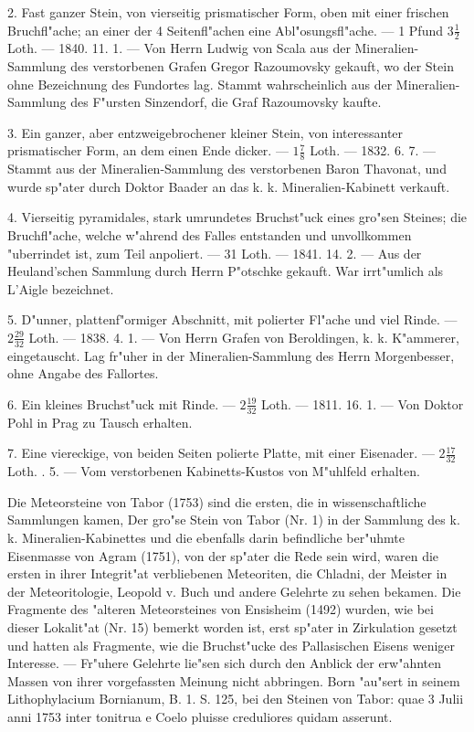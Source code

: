\documentclass[a4paper, 11pt, oneside, polutonikogreek, german]{article}
\begin{document}
2. Fast ganzer Stein, von vierseitig prismatischer Form, oben mit einer frischen Bruchfl"ache; an einer der 4 Seitenfl"achen eine Abl"osungsfl"ache. --- 1 Pfund $\mathfrak{3\frac{1}{2}}$ Loth. --- 1840. 11. 1. --- Von Herrn Ludwig von Scala aus der Mineralien-Sammlung des verstorbenen Grafen Gregor Razoumovsky gekauft, wo der Stein ohne Bezeichnung des Fundortes lag. Stammt wahrscheinlich aus der Mineralien-Sammlung des F"ursten Sinzendorf, die Graf Razoumovsky kaufte.

3. Ein ganzer, aber entzweigebrochener kleiner Stein, von interessanter prismatischer Form, an dem einen Ende dicker. --- $\mathfrak{1\frac{7}{8}}$ Loth. --- 1832. 6. 7. --- Stammt aus der Mineralien-Sammlung des verstorbenen Baron Thavonat, und wurde sp"ater durch Doktor Baader an das k. k. Mineralien-Kabinett verkauft.

4. Vierseitig pyramidales, stark umrundetes Bruchst"uck eines gro"sen Steines; die Bruchfl"ache, welche w"ahrend des Falles entstanden und unvollkommen "uberrindet ist, zum Teil anpoliert. --- 31 Loth. --- 1841. 14. 2. --- Aus der Heuland'schen Sammlung durch Herrn P"otschke gekauft. War irrt"umlich als L'Aigle bezeichnet.

5. D"unner, plattenf"ormiger Abschnitt, mit polierter Fl"ache und viel Rinde. --- $\mathfrak{2\frac{29}{32}}$ Loth. --- 1838. 4. 1. --- Von Herrn Grafen von Beroldingen, k. k. K"ammerer, eingetauscht. Lag fr"uher in der Mineralien-Sammlung des Herrn Morgenbesser, ohne Angabe des Fallortes.

6. Ein kleines Bruchst"uck mit Rinde. --- $\mathfrak{2\frac{19}{32}}$ Loth. --- 1811. 16. 1. --- Von Doktor Pohl in Prag zu Tausch erhalten.

7. Eine viereckige, von beiden Seiten polierte Platte, mit einer Eisenader. --- $\mathfrak{2\frac{17}{32}}$ Loth. . 5. --- Vom verstorbenen Kabinetts-Kustos von M"uhlfeld erhalten.

\setlength{\leftskip}{10mm}
\setlength{\parindent}{0pt}

{\footnotesize Die Meteorsteine von Tabor (1753) sind die ersten, die in wissenschaftliche Sammlungen kamen, Der gro"se Stein von Tabor (Nr. 1) in der Sammlung des k. k. Mineralien-Kabinettes und die ebenfalls darin befindliche ber"uhmte Eisenmasse von Agram (1751), von der sp"ater die Rede sein wird, waren die ersten in ihrer Integrit"at verbliebenen Meteoriten, die Chladni, der Meister in der Meteoritologie, Leopold v. Buch und andere Gelehrte zu sehen bekamen. Die Fragmente des "alteren Meteorsteines von Ensisheim (1492) wurden, wie bei dieser Lokalit"at (Nr. 15) bemerkt worden ist, erst sp"ater in Zirkulation gesetzt und hatten als Fragmente, wie die Bruchst"ucke des Pallasischen Eisens weniger Interesse. --- Fr"uhere Gelehrte lie"sen sich durch den Anblick der erw"ahnten Massen von ihrer vorgefassten Meinung nicht abbringen. Born "au"sert in seinem Lithophylacium Bornianum, B. 1. S. 125, bei den Steinen von Tabor: quae 3 Julii anni 1753 inter tonitrua e Coelo pluisse creduliores quidam asserunt.}
\end{document}
